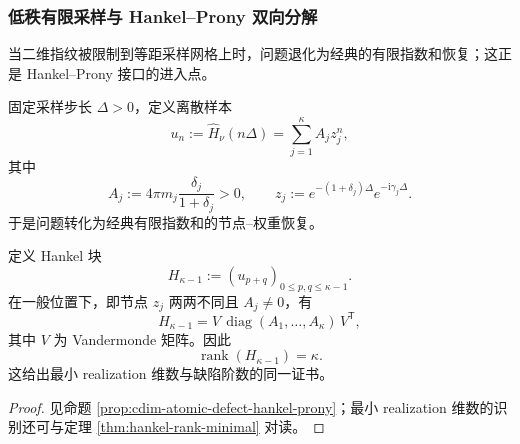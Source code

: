 \subsubsection{低秩有限采样与 Hankel--Prony 双向分解}\label{subsubsec:typed-address-biaxial-completion-comoving-prony}
当二维指纹被限制到等距采样网格上时，问题退化为经典的有限指数和恢复；这正是 Hankel--Prony 接口的进入点。

\begin{definition}[等距频谱样本与指数节点]\label{def:typed-address-biaxial-completion-comoving-discrete-samples}
固定采样步长 \(\Delta>0\)，定义离散样本
\[
u_n:=\widehat H_\nu(n\Delta)
=
\sum_{j=1}^{\kappa} A_j z_j^n,
\]
其中
\[
A_j:=4\pi m_j\frac{\delta_j}{1+\delta_j}>0,
\qquad
z_j:=e^{-(1+\delta_j)\Delta}e^{-\mathrm{i}\gamma_j\Delta}.
\]
于是问题转化为经典有限指数和的节点--权重恢复。
\end{definition}

\begin{proposition}\label{prop:typed-address-biaxial-completion-comoving-hankel}
定义 Hankel 块
\[
H_{\kappa-1}:=(u_{p+q})_{0\le p,q\le \kappa-1}.
\]
在一般位置下，即节点 \(z_j\) 两两不同且 \(A_j\neq 0\)，有
\[
H_{\kappa-1}
=
V\,\operatorname{diag}(A_1,\dots,A_\kappa)\,V^{\mathsf T},
\]
其中 \(V\) 为 Vandermonde 矩阵。因此
\[
\operatorname{rank}(H_{\kappa-1})=\kappa.
\]
这给出最小 realization 维数与缺陷阶数的同一证书。
\end{proposition}
\begin{proof}
见命题 \ref{prop:cdim-atomic-defect-hankel-prony}；最小 realization 维数的识别还可与定理 \ref{thm:hankel-rank-minimal} 对读。
\end{proof}

